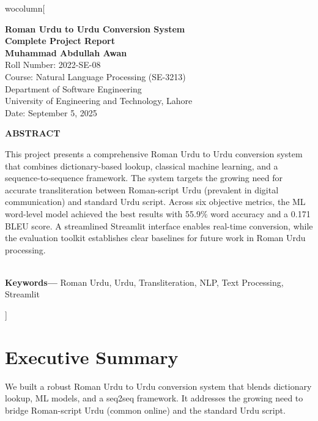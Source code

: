 \documentclass[10pt,twocolumn]{article}
\begin{document}
	wocolumn[
\begin{center}
{\Huge\bfseries Roman Urdu to Urdu Conversion System}\\[0.8em]
{\Large\bfseries Complete Project Report}\\[1.5em]

{\large\textbf{Muhammad Abdullah Awan}}\\[0.3em]
{\normalsize Roll Number: 2022-SE-08}\\[0.2em]
{\normalsize Course: Natural Language Processing (SE-3213)}\\[0.2em]
{\normalsize Department of Software Engineering}\\[0.2em]
{\normalsize University of Engineering and Technology, Lahore}\\[0.5em]
{\normalsize Date: September 5, 2025}\\[2em]

\begin{minipage}{0.85\textwidth}
\begin{center}
\textbf{\large ABSTRACT}
\end{center}
\small
This project presents a comprehensive Roman Urdu to Urdu conversion system that combines dictionary-based lookup, classical machine learning, and a sequence-to-sequence framework. The system targets the growing need for accurate transliteration between Roman-script Urdu (prevalent in digital communication) and standard Urdu script. Across six objective metrics, the ML word-level model achieved the best results with 55.9\% word accuracy and a 0.171 BLEU score. A streamlined Streamlit interface enables real-time conversion, while the evaluation toolkit establishes clear baselines for future work in Roman Urdu processing.
\end{minipage}
\\[0.6em]
{\small\textbf{Keywords—} Roman Urdu, Urdu, Transliteration, NLP, Text Processing, Streamlit}
\vspace{1.5em}
\end{center}
]

\section{Executive Summary}
We built a robust Roman Urdu to Urdu conversion system that blends dictionary lookup, ML models, and a seq2seq framework. It addresses the growing need to bridge Roman-script Urdu (common online) and the standard Urdu script.
\end{document}
